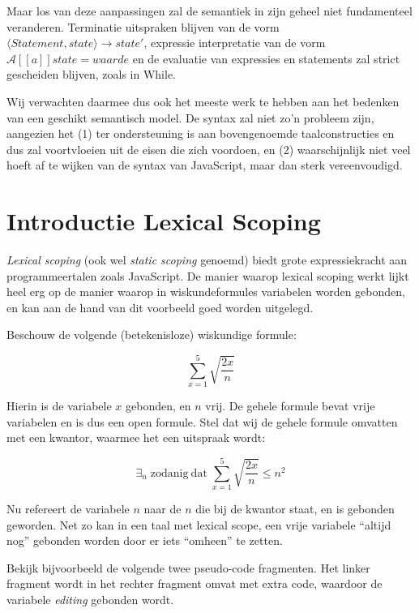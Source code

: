 \documentclass[a4paper,11pt]{article}
\begin{document}
Maar los van deze aanpassingen zal de semantiek in zijn geheel niet fundamenteel veranderen. Terminatie uitspraken blijven van de vorm $\langle \mathit{Statement}, \mathit{state}\rangle \longrightarrow \mathit{state}'$, expressie interpretatie van de vorm $\mathcal{A}{[\![a]\!]}\mathit{state} = \mathit{waarde}$ en de evaluatie van expressies en statements zal strict gescheiden blijven, zoals in While.

Wij verwachten daarmee dus ook het meeste werk te hebben aan het bedenken van een geschikt semantisch model. De syntax zal niet zo'n probleem zijn, aangezien het (1) ter ondersteuning is aan bovengenoemde taalconstructies en dus zal voortvloeien uit de eisen die zich voordoen, en (2) waarschijnlijk niet veel hoeft af te wijken van de syntax van JavaScript, maar dan sterk vereenvoudigd.

\section*{Introductie Lexical Scoping}

\emph{Lexical scoping} (ook wel \emph{static scoping} genoemd) biedt grote expressiekracht aan programmeertalen zoals JavaScript. De manier waarop lexical scoping werkt lijkt heel erg op de manier waarop in wiskundeformules variabelen worden gebonden, en kan aan de hand van dit voorbeeld goed worden uitgelegd.

Beschouw de volgende (betekenisloze) wiskundige formule:

\begin{equation*}
	\sum_{x=1}^5{\sqrt{\frac{2x}{n}}}
\end{equation*}

Hierin is de variabele $x$ gebonden, en $n$ vrij. De gehele formule bevat vrije variabelen en is dus een open formule. Stel dat wij de gehele formule omvatten met een kwantor, waarmee het een uitspraak wordt:

\begin{equation*}
	\exists_n\; \mathrm{zodanig~dat}\;
	\sum_{x=1}^5{\sqrt{\frac{2x}{n}}}
	\le n^2
\end{equation*}

Nu refereert de variabele $n$ naar de $n$ die bij de kwantor staat, en is gebonden geworden. Net zo kan in een taal met lexical scope, een vrije variabele ``altijd nog'' gebonden worden door er iets ``omheen'' te zetten.

Bekijk bijvoorbeeld de volgende twee pseudo-code fragmenten. Het linker fragment wordt in het rechter fragment omvat met extra code, waardoor de variabele \textit{editing} gebonden wordt.
\end{document}
